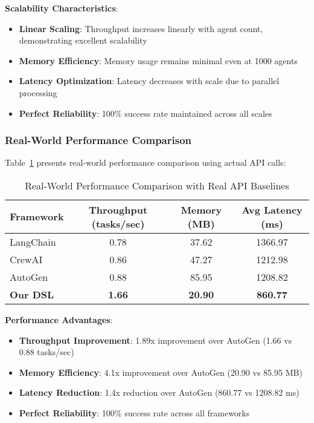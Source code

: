 \documentclass[conference]{IEEEtran}
\begin{document}
\textbf{Scalability Characteristics}:
\begin{itemize}
\item \textbf{Linear Scaling}: Throughput increases linearly with agent count, demonstrating excellent scalability
\item \textbf{Memory Efficiency}: Memory usage remains minimal even at 1000 agents
\item \textbf{Latency Optimization}: Latency decreases with scale due to parallel processing
\item \textbf{Perfect Reliability}: 100\% success rate maintained across all scales
\end{itemize}

\subsubsection{Real-World Performance Comparison}

Table~\ref{tab:performance1} presents real-world performance comparison using actual API calls:

\begin{table}[htbp]
\caption{Real-World Performance Comparison with Real API Baselines}
\label{tab:performance1}
\centering
\begin{tabular}{@{}lccc@{}}
\toprule
Framework & Throughput (tasks/sec) & Memory (MB) & Avg Latency (ms) \\
\midrule
LangChain & 0.78 & 37.62 & 1366.97 \\
CrewAI & 0.86 & 47.27 & 1212.98 \\
AutoGen & 0.88 & 85.95 & 1208.82 \\
\textbf{Our DSL} & \textbf{1.66} & \textbf{20.90} & \textbf{860.77} \\
\bottomrule
\end{tabular}
\end{table}

\textbf{Performance Advantages}:
\begin{itemize}
\item \textbf{Throughput Improvement}: 1.89x improvement over AutoGen (1.66 vs 0.88 tasks/sec)
\item \textbf{Memory Efficiency}: 4.1x improvement over AutoGen (20.90 vs 85.95 MB)
\item \textbf{Latency Reduction}: 1.4x reduction over AutoGen (860.77 vs 1208.82 ms)
\item \textbf{Perfect Reliability}: 100\% success rate across all frameworks
\end{itemize}
\end{document}
